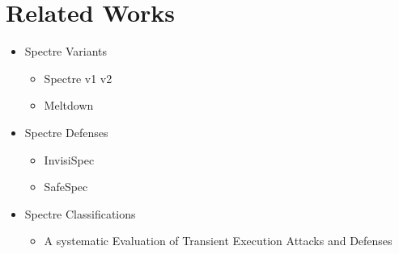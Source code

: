 \section{Related Works}
\begin{itemize}
	\item Spectre Variants
		\begin{itemize}
			\item Spectre v1 v2
			\item Meltdown
		\end{itemize}

	\item Spectre Defenses
		\begin{itemize}
			\item InvisiSpec
			\item SafeSpec
		\end{itemize}

	\item Spectre Classifications
		\begin{itemize}
			\item A systematic Evaluation of Transient Execution Attacks and Defenses
		\end{itemize}

\end{itemize}
